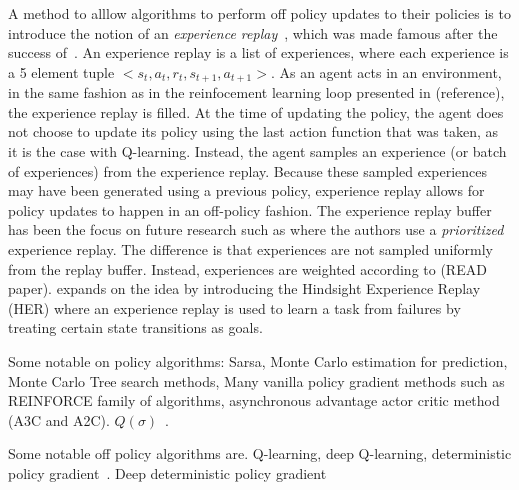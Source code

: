 \documentclass{../main.tex}{subfiles}
\begin{document}
A method to alllow algorithms to perform off policy updates to their policies is to introduce the notion of an \textit{experience replay}~\citep{Lin1993}, which was made famous after the success of~\cite{Mnih2013}. An experience replay is a list of experiences, where each experience is a 5 element tuple $<s_t, a_t, r_t, s_{t+1}, a_{t+1}>$. As an agent acts in an environment, in the same fashion as in the reinfocement learning loop presented in (reference), the experience replay is filled. At the time of updating the policy, the agent does not choose to update its policy using the last action function that was taken, as it is the case with Q-learning. Instead, the agent samples an experience (or batch of experiences) from the experience replay. Because these sampled experiences may have been generated using a previous policy, experience replay allows for policy updates to happen in an off-policy fashion. The experience replay buffer has been the focus on future research such as \citep{Schaul2015, Hessel2017} where the authors use a \textit{prioritized} experience replay. The difference is that experiences are not sampled uniformly from the replay buffer. Instead, experiences are weighted according to (READ paper). \cite{Andrychowicz2017} expands on the idea by introducing the Hindsight Experience Replay (HER) where an experience replay is used to learn a task from failures by treating certain state transitions as goals.


Some notable on policy algorithms: Sarsa, Monte Carlo estimation for prediction, Monte Carlo Tree search methods,  Many vanilla policy gradient methods such as REINFORCE\citep{Williams1992} family of algorithms, asynchronous advantage actor critic method (A3C and A2C). $Q(\sigma)$~\citep{Deasis2017}.

Some notable off policy algorithms are. Q-learning, deep Q-learning, deterministic policy gradient~\citep{Silver2014}. Deep deterministic policy gradient~\citep{Lillicrap2015}


% 
\end{document}

